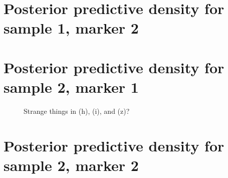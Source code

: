 \documentclass[10pt]{article} %
\begin{document}
\newpage
\section{Posterior predictive density for sample 1, marker 2}
\begin{figure}[H]
  \begin{center}  %
  \end{center}
  \label{fig:dd12}
\end{figure}

\newpage
\section{Posterior predictive density for sample 2, marker 1}
\begin{figure}[H]
  \begin{center}  %
  \end{center}
  \label{fig:dd21}
  \caption{Strange things in (h), (i), and (z)?}
\end{figure}

\newpage
\section{Posterior predictive density for sample 2, marker 2}
\begin{figure}[H]
  \begin{center}  %
  \end{center}
  \label{fig:dd22}
\end{figure}

\newpage
\end{document}
